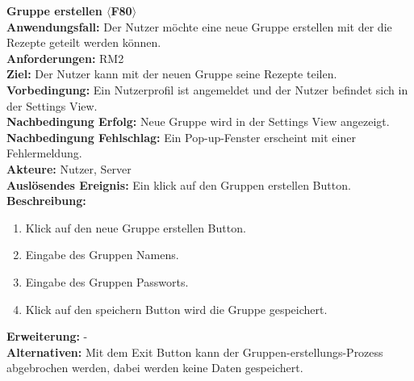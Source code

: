 \documentclass[parskip=full]{scrartcl}
\begin{document}
\textbf{Gruppe erstellen $\langle$F80$\rangle$}\\
\textbf{Anwendungsfall:} Der Nutzer möchte eine neue Gruppe erstellen mit der die Rezepte geteilt werden können. \\
\textbf{Anforderungen:} RM2 \\
\textbf{Ziel:} Der Nutzer kann mit der neuen Gruppe seine Rezepte teilen.\\
\textbf{Vorbedingung:} Ein Nutzerprofil ist angemeldet und der Nutzer befindet sich in der Settings View.\\
\textbf{Nachbedingung Erfolg:} Neue Gruppe wird in der Settings View angezeigt.\\
\textbf{Nachbedingung Fehlschlag:} Ein Pop-up-Fenster erscheint mit einer Fehlermeldung.\\
\textbf{Akteure:} Nutzer, Server\\
\textbf{Auslösendes Ereignis:} Ein klick auf den Gruppen erstellen Button.\\
\textbf{Beschreibung:}
\begin{enumerate}
    \item Klick auf den neue Gruppe erstellen Button.
    \item Eingabe des Gruppen Namens.
    \item Eingabe des Gruppen Passworts.
    \item Klick auf den speichern Button wird die Gruppe gespeichert.
\end{enumerate}
\textbf{Erweiterung:} -\\
\textbf{Alternativen:} Mit dem Exit Button kann der Gruppen-erstellungs-Prozess abgebrochen werden, dabei werden keine Daten gespeichert.\\
\newpage
\end{document}

